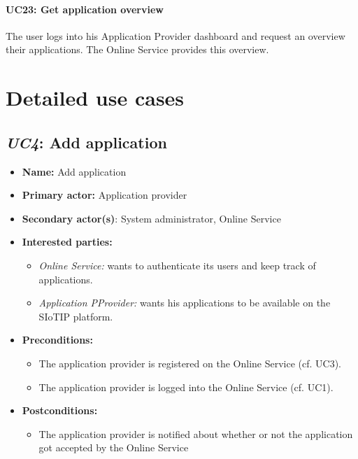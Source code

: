 \documentclass[english]{sareport}
\begin{document}
\paragraph{UC23: Get application overview}
The user logs into his Application Provider dashboard and request an overview their applications. The Online Service provides this overview.


\section{Detailed use cases}

\subsection{\emph{UC4}: Add application}
\begin{itemize}
    \item \textbf{Name:} Add application
    \item \textbf{Primary actor:} Application provider
    \item \textbf{Secondary actor(s)}: System administrator, Online Service
    \item \textbf{Interested parties:} 
        \begin{itemize}
            \item \textit{Online Service:} wants to authenticate its users and keep track of applications.
            \item \textit{Application PProvider:} wants his applications to be available on the SIoTIP platform.
        \end{itemize}

    \item \textbf{Preconditions:}
        \begin{itemize}
            \item The application provider is registered on the Online Service (cf. UC3).
            \item The application provider is logged into the Online Service (cf. UC1).
        \end{itemize}

    \item \textbf{Postconditions:}
        \begin{itemize}
            \item The application provider is notified about whether or not the application got accepted by the Online Service
        \end{itemize}
        

\end{itemize}
\end{document}
